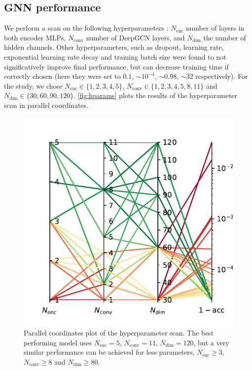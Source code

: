 \documentclass[10pt,conference,compsocconf,a4paper]{IEEEtran}
\newcommand*{\shortautoref}[1]{%
	\begingroup
	\def\equationautorefname{\textsc{Eq.}}%
	\def\tableautorefname{\textsc{Tab.}}%
	\def\figureautorefname{\textsc{Fig.}}%
	\autoref{#1}%
	\endgroup
}
\begin{document}
	\subsection{GNN performance}

		We perform a scan on the following hyperparameters : $N_\textrm{enc}$ number of layers in both encoder MLPs, $N_\textrm{conv}$ number of DeepGCN layers, and $N_\textrm{dim}$ the number of hidden channels. Other hyperparameters, such as dropout, learning rate, exponential learning rate decay and training batch size were found to not significatively improve final performance, but can decrease training time if correctly chosen (here they were set to $0.1$, $\sim 10^{-4}$, $\sim 0.98$, $\sim 32$ respectively). For the study, we chose $N_\textrm{enc} \in \{1,2,3,4,5\}$, $N_\textrm{conv} \in \{1,2,3,4,5,8,11\}$ and $N_\textrm{dim} \in \{30, 60, 90, 120\}$. \shortautoref{fig:hparams} plots the results of the hyperparameter scan in parallel coordinates.

		\begin{figure}
			\centering
			\includegraphics[width=\linewidth]{figures/hparams.pdf}
			\caption{Parallel coordinates plot of the hyperparameter scan. The best performing model uses $N_\textrm{enc}=5$, $N_\textrm{conv}=11$, $N_\textrm{dim}=120$, but a very similar performance can be achieved for less parameters, $N_\textrm{enc} \geq 3$, $N_\textrm{conv} \geq 8$ and $N_\textrm{dim} \geq 80$.}
			\label{fig:hparams}
		\end{figure}
\end{document}
